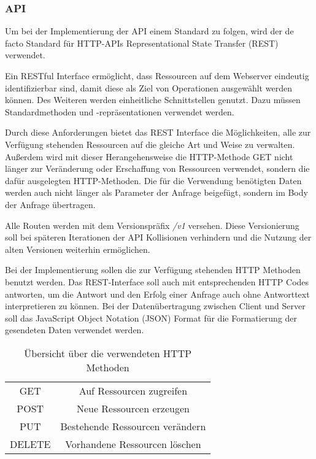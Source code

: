 \subsubsection{API}
Um bei der Implementierung der API einem Standard zu folgen, wird der de facto Standard für HTTP-APIs Representational State Transfer (REST) verwendet.

Ein RESTful Interface ermöglicht, dass Ressourcen auf dem Webserver eindeutig identifizierbar sind, damit diese als Ziel von Operationen ausgewählt werden können. Des Weiteren werden einheitliche Schnittstellen genutzt. Dazu müssen Standardmethoden und -repräsentationen verwendet werden. \cite{beimsWebApplikationenREST2014}

Durch diese Anforderungen bietet das REST Interface die Möglichkeiten, alle zur Verfügung stehenden Ressourcen auf die gleiche Art und Weise zu verwalten. Außerdem wird mit dieser Herangehensweise die HTTP-Methode GET nicht länger zur Veränderung oder Erschaffung von Ressourcen verwendet, sondern die dafür ausgelegten HTTP-Methoden. Die für die Verwendung benötigten Daten werden auch nicht länger als Parameter der Anfrage beigefügt, sondern im Body der Anfrage übertragen. \cite{beimsWebApplikationenREST2014}

Alle Routen werden mit dem Versionspräfix \textit{/v1} versehen. Diese Versionierung soll bei späteren Iterationen der API Kollisionen verhindern und die Nutzung der alten Versionen weiterhin ermöglichen. 

Bei der Implementierung sollen die zur Verfügung stehenden HTTP Methoden benutzt werden. Das REST-Interface soll auch mit entsprechenden HTTP Codes antworten, um die Antwort und den Erfolg einer Anfrage auch ohne Antworttext interpretieren zu können. Bei der Datenübertragung zwischen Client und Server soll das JavaScript Object Notation (JSON) Format für die Formatierung der gesendeten Daten verwendet werden.

\begin{table}
	\centering
	\begin{tabular}{c c}
		GET & Auf Ressourcen zugreifen \\ 
		POST & Neue Ressourcen erzeugen \\  
		PUT & Bestehende Ressourcen verändern \\
		DELETE & Vorhandene Ressourcen löschen \\
	\end{tabular}
	\caption{Übersicht über die verwendeten HTTP Methoden}
	\label{table:http-methods}
\end{table}

